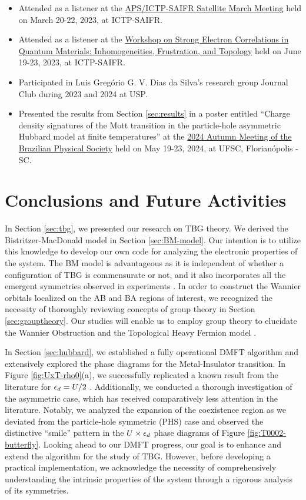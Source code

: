 \documentclass[12pt]{report}
\begin{document}
\begin{itemize}
\item Attended as a listener at the \href{https://www.ictp-saifr.org/apsmarch23/}{APS/ICTP-SAIFR Satellite March Meeting} held on March 20-22, 2023, at ICTP-SAIFR.
\item Attended as a listener at the \href{https://www.ictp-saifr.org/qm2023/}{Workshop on Strong Electron Correlations in Quantum Materials: Inhomogeneities, Frustration, and Topology} held on June 19-23, 2023, at ICTP-SAIFR.
\item Participated in Luis Gregório G. V. Dias da Silva's research group Journal Club during 2023 and 2024 at USP.
\item Presented the results from Section \ref{sec:results} in a poster entitled ``Charge density signatures of the Mott transition in the particle-hole asymmetric Hubbard model at finite temperatures'' at the \href{https://www1.fisica.org.br/~eosbf/2024/index.php/en/}{2024 Autumn Meeting of the Brazilian Physical Society} held on May 19-23, 2024, at UFSC, Florianópolis - SC.
\end{itemize}


\chapter{Conclusions and Future Activities} \label{chp:conclusions}

In Section \ref{sec:tbg}, we presented our research on TBG theory. We derived the Bistritzer-MacDonald model \cite{macdonald2011} in Section \ref{sec:BM-model}. Our intention is to utilize this knowledge to develop our own code for analyzing the electronic properties of the system. The BM model is advantageous as it is independent of whether a configuration of TBG is commensurate or not, and it also incorporates all the emergent symmetries observed in experiments \cite{zou2018}. In order to construct the Wannier orbitals localized on the AB and BA regions of interest, we recognized the necessity of thoroughly reviewing concepts of group theory in Section \ref{sec:grouptheory}. Our studies will enable us to employ group theory to elucidate the Wannier Obstruction \cite{zou2018} and the Topological Heavy Fermion model \cite{topoheavyfermion2022}.

In Section \ref{sec:hubbard}, we established a fully operational DMFT algorithm and extensively explored the phase diagrams for the Metal-Insulator transition. In Figure \ref{fig:UxT-rho0}(a), we successfully replicated a known result from the literature for $\epsilon_d = U/2$ \cite{georges1996}. Additionally, we conducted a thorough investigation of the asymmetric case, which has received comparatively less attention in the literature. Notably, we analyzed the expansion of the coexistence region as we deviated from the particle-hole symmetric (PHS) case and observed the distinctive ``smile'' pattern in the $U \times \epsilon_d$ phase diagrams of Figure \ref{fig:T0002-butterfly}. Looking ahead to our DMFT progress, our goal is to enhance and extend the algorithm for the study of TBG. However, before developing a practical implementation, we acknowledge the necessity of comprehensively understanding the intrinsic properties of the system through a rigorous analysis of its symmetries.

%




\end{document}
